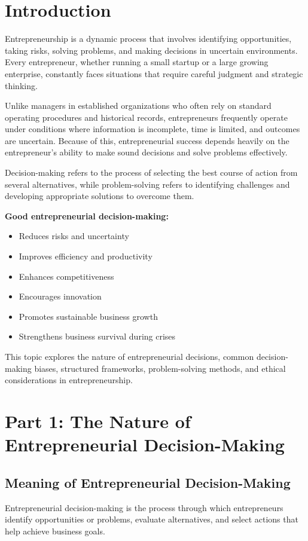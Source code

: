\documentclass[12pt,a4paper]{article}
\begin{document}

\section*{Introduction}
Entrepreneurship is a dynamic process that involves identifying opportunities, taking risks, solving problems, and making decisions in uncertain environments. Every entrepreneur, whether running a small startup or a large growing enterprise, constantly faces situations that require careful judgment and strategic thinking.

Unlike managers in established organizations who often rely on standard operating procedures and historical records, entrepreneurs frequently operate under conditions where information is incomplete, time is limited, and outcomes are uncertain. Because of this, entrepreneurial success depends heavily on the entrepreneur’s ability to make sound decisions and solve problems effectively.

Decision-making refers to the process of selecting the best course of action from several alternatives, while problem-solving refers to identifying challenges and developing appropriate solutions to overcome them.

\textbf{Good entrepreneurial decision-making:}
\begin{itemize}
    \item Reduces risks and uncertainty
    \item Improves efficiency and productivity
    \item Enhances competitiveness
    \item Encourages innovation
    \item Promotes sustainable business growth
    \item Strengthens business survival during crises
\end{itemize}

This topic explores the nature of entrepreneurial decisions, common decision-making biases, structured frameworks, problem-solving methods, and ethical considerations in entrepreneurship.

\section*{Part 1: The Nature of Entrepreneurial Decision-Making}

\subsection*{Meaning of Entrepreneurial Decision-Making}
Entrepreneurial decision-making is the process through which entrepreneurs identify opportunities or problems, evaluate alternatives, and select actions that help achieve business goals.
\end{document}
